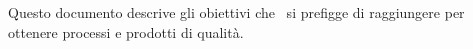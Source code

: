 Questo documento descrive gli obiettivi che \gruppo\ si prefigge di raggiungere
per ottenere processi e prodotti di qualità.
